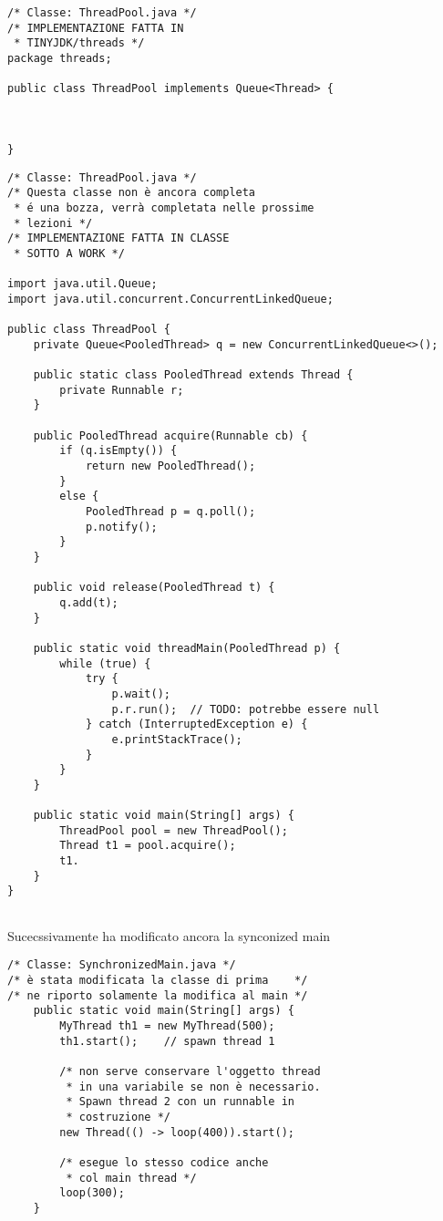 \begin{lstlisting}
/* Classe: ThreadPool.java */
/* IMPLEMENTAZIONE FATTA IN 
 * TINYJDK/threads */
package threads;

public class ThreadPool implements Queue<Thread> {



}

\end{lstlisting}

\begin{lstlisting}
/* Classe: ThreadPool.java */
/* Questa classe non è ancora completa 
 * é una bozza, verrà completata nelle prossime
 * lezioni */
/* IMPLEMENTAZIONE FATTA IN CLASSE 
 * SOTTO A WORK */
 
import java.util.Queue;
import java.util.concurrent.ConcurrentLinkedQueue;

public class ThreadPool {
    private Queue<PooledThread> q = new ConcurrentLinkedQueue<>();

    public static class PooledThread extends Thread {
        private Runnable r;
    }

    public PooledThread acquire(Runnable cb) {
        if (q.isEmpty()) {
            return new PooledThread();
        }
        else {
            PooledThread p = q.poll();
            p.notify();
        }
    }

    public void release(PooledThread t) {
        q.add(t);
    }

    public static void threadMain(PooledThread p) {
        while (true) {
            try {
                p.wait();
                p.r.run();  // TODO: potrebbe essere null
            } catch (InterruptedException e) {
                e.printStackTrace();
            }
        }
    }

    public static void main(String[] args) {
        ThreadPool pool = new ThreadPool();
        Thread t1 = pool.acquire();
        t1.
    }
}


\end{lstlisting}




\noindent Sucecssivamente ha modificato ancora la synconized main

\begin{lstlisting}
/* Classe: SynchronizedMain.java */
/* è stata modificata la classe di prima    */
/* ne riporto solamente la modifica al main */
    public static void main(String[] args) {
        MyThread th1 = new MyThread(500);
        th1.start();    // spawn thread 1

        /* non serve conservare l'oggetto thread 
         * in una variabile se non è necessario.
         * Spawn thread 2 con un runnable in
         * costruzione */
        new Thread(() -> loop(400)).start();    

        /* esegue lo stesso codice anche
         * col main thread */
        loop(300);  
    }

\end{lstlisting}











